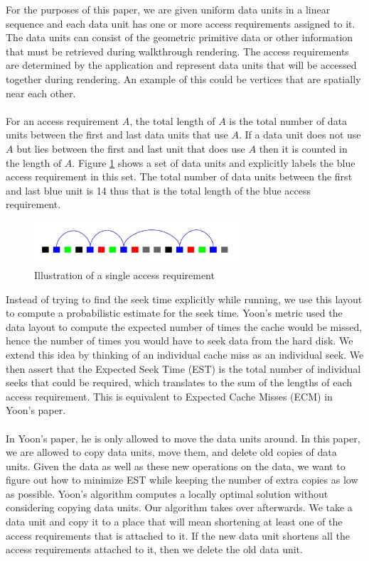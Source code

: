 \documentclass[conference]{acmsiggraph}
\begin{document}
For the purposes of this paper, we are given uniform data units in a linear sequence and each data unit has one or more access requirements assigned to it. The data units can consist of the geometric primitive data or other information that must be retrieved during walkthrough rendering. The access requirements are determined by the application and represent data units that will be accessed together during rendering. An example of this could be vertices that are spatially near each other. \\
\\
For an access requirement $A$, the total length of $A$ is the total number of data units between the first and last data units that use $A$. If a data unit does not use $A$ but lies between the first and last unit that does use $A$ then it is counted in the length of $A$. Figure \ref{singleAR} shows a set of data units and explicitly labels the blue access requirement in this set. The total number of data units between the first and last blue unit is 14 thus that is the total length of the blue access requirement.
\begin{figure}[ht]
\centering
\includegraphics[width=3in]{SingleAR_start.jpg}
\caption{Illustration of a single access requirement}
\label{singleAR}
\end{figure}
Instead of trying to find the seek time explicitly while running, we use this layout to compute a probabilistic estimate for the seek time. Yoon's metric used the data layout to compute the expected number of times the cache would be missed, hence the number of times you would have to seek data from the hard disk. We extend this idea by thinking of an individual cache miss as an individual seek. We then assert that the Expected Seek Time (EST) is the total number of individual seeks that could be required, which translates to the sum of the lengths of each access requirement. This is equivalent to Expected Cache Misses (ECM) in Yoon's paper. \\
\\
In Yoon's paper, he is only allowed to move the data units around. In this paper, we are allowed to copy data units, move them, and delete old copies of data units. Given the data as well as these new operations on the data, we want to figure out how to minimize EST while keeping the number of extra copies as low as possible. Yoon's algorithm computes a locally optimal solution without considering copying data units. Our algorithm takes over afterwards. We take a data unit and copy it to a place that will mean shortening at least one of the access requirements that is attached to it. If the new data unit shortens all the access requirements attached to it, then we delete the old data unit. \\
\end{document}
